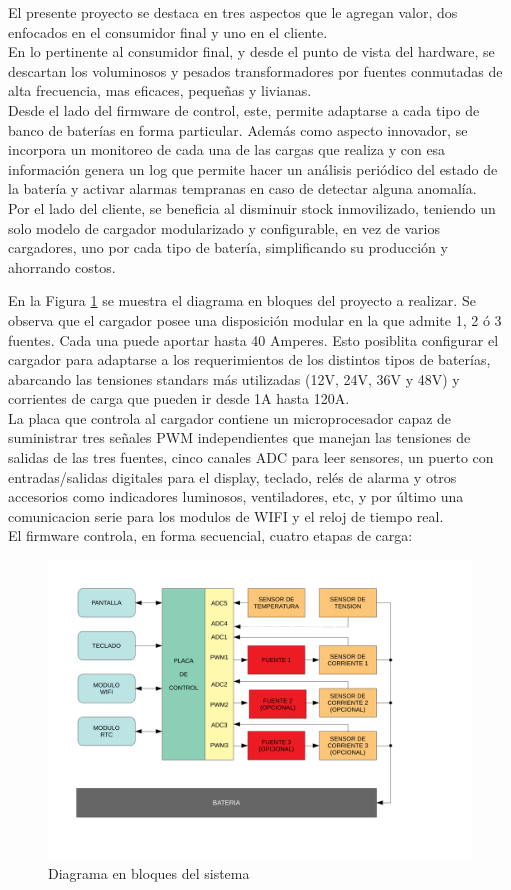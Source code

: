 \documentclass[11pt]{charter}
\begin{document}
El presente proyecto se destaca en tres aspectos que le agregan valor, dos enfocados en el consumidor final y uno en el cliente.
\\[3pt]
En lo pertinente al consumidor final, y desde el punto de vista del hardware, se descartan los voluminosos y pesados transformadores por fuentes conmutadas de alta frecuencia, mas eficaces, pequeñas y livianas.\\
Desde el lado del firmware de control, este, permite adaptarse a cada tipo de banco de baterías en forma particular. Además como aspecto innovador, se incorpora un monitoreo de cada una de las cargas que realiza y con esa información genera un log que permite hacer un análisis periódico del estado de la batería y activar alarmas tempranas en caso de detectar alguna anomalía.
\\[3pt]
Por el lado del cliente, se beneficia al disminuir stock inmovilizado, teniendo un solo modelo de cargador modularizado y configurable, en vez de varios cargadores, uno por cada tipo de batería, simplificando su producción y ahorrando costos.

En la Figura \ref{fig:diagBloques} se muestra el diagrama en bloques del proyecto a realizar. Se observa que el cargador posee una disposición modular en la que admite 1, 2 ó 3 fuentes. Cada una puede aportar hasta 40 Amperes. Esto posiblita configurar el cargador para adaptarse a los requerimientos de los distintos tipos de baterías, abarcando las tensiones standars más utilizadas (12V, 24V, 36V y 48V) y corrientes de carga que pueden ir desde 1A hasta 120A.\\[3pt]
La placa que controla al cargador contiene un microprocesador capaz de suministrar tres señales PWM independientes  que manejan las tensiones de salidas de las tres fuentes, cinco canales ADC para leer sensores, un puerto con entradas/salidas digitales para el display, teclado, relés de alarma y otros accesorios como indicadores luminosos, ventiladores, etc, y por último una comunicacion serie para los modulos de WIFI y el reloj de tiempo real.\\[3pt]
El firmware controla, en forma secuencial, cuatro etapas de carga:


\begin{figure}[htpb]
\centering 
\includegraphics[width=.8\textwidth]{./Figuras/Plan_Figura1.pdf}
\caption{Diagrama en bloques del sistema}
\label{fig:diagBloques}
\end{figure}
\end{document}
